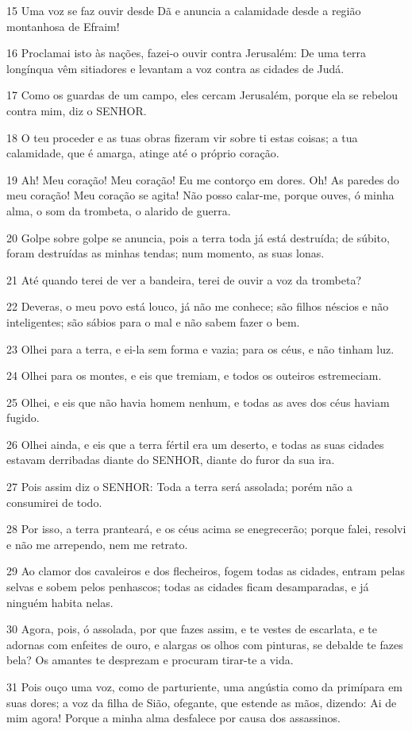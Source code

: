 \par 15 Uma voz se faz ouvir desde Dã e anuncia a calamidade desde a região montanhosa de Efraim!
\par 16 Proclamai isto às nações, fazei-o ouvir contra Jerusalém: De uma terra longínqua vêm sitiadores e levantam a voz contra as cidades de Judá.
\par 17 Como os guardas de um campo, eles cercam Jerusalém, porque ela se rebelou contra mim, diz o SENHOR.
\par 18 O teu proceder e as tuas obras fizeram vir sobre ti estas coisas; a tua calamidade, que é amarga, atinge até o próprio coração.
\par 19 Ah! Meu coração! Meu coração! Eu me contorço em dores. Oh! As paredes do meu coração! Meu coração se agita! Não posso calar-me, porque ouves, ó minha alma, o som da trombeta, o alarido de guerra.
\par 20 Golpe sobre golpe se anuncia, pois a terra toda já está destruída; de súbito, foram destruídas as minhas tendas; num momento, as suas lonas.
\par 21 Até quando terei de ver a bandeira, terei de ouvir a voz da trombeta?
\par 22 Deveras, o meu povo está louco, já não me conhece; são filhos néscios e não inteligentes; são sábios para o mal e não sabem fazer o bem.
\par 23 Olhei para a terra, e ei-la sem forma e vazia; para os céus, e não tinham luz.
\par 24 Olhei para os montes, e eis que tremiam, e todos os outeiros estremeciam.
\par 25 Olhei, e eis que não havia homem nenhum, e todas as aves dos céus haviam fugido.
\par 26 Olhei ainda, e eis que a terra fértil era um deserto, e todas as suas cidades estavam derribadas diante do SENHOR, diante do furor da sua ira.
\par 27 Pois assim diz o SENHOR: Toda a terra será assolada; porém não a consumirei de todo.
\par 28 Por isso, a terra pranteará, e os céus acima se enegrecerão; porque falei, resolvi e não me arrependo, nem me retrato.
\par 29 Ao clamor dos cavaleiros e dos flecheiros, fogem todas as cidades, entram pelas selvas e sobem pelos penhascos; todas as cidades ficam desamparadas, e já ninguém habita nelas.
\par 30 Agora, pois, ó assolada, por que fazes assim, e te vestes de escarlata, e te adornas com enfeites de ouro, e alargas os olhos com pinturas, se debalde te fazes bela? Os amantes te desprezam e procuram tirar-te a vida.
\par 31 Pois ouço uma voz, como de parturiente, uma angústia como da primípara em suas dores; a voz da filha de Sião, ofegante, que estende as mãos, dizendo: Ai de mim agora! Porque a minha alma desfalece por causa dos assassinos.

